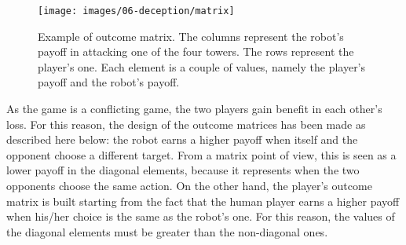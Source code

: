\begin{figure}[h]
    \centering
    \texttt{[image: images/06-deception/matrix]}
    \caption{Example of outcome matrix. The columns represent the  robot's payoff in attacking one of the four towers. The rows represent the player's one. Each element is a couple of values, namely the player's payoff and the robot's payoff.}
    \label{fig::matrix}
\end{figure}

As the game is a conflicting game, the two players gain benefit in each other's loss. For this reason, the design of the outcome matrices has been made as described here below: the robot earns a higher payoff when itself and the opponent choose a different target. From a matrix point of view, this is seen as a lower payoff in the diagonal elements, because it represents when the two opponents choose the same action.
On the other hand, the player's outcome matrix is built starting from the fact that the human player earns a higher payoff when his/her choice is the same as the robot's one. For this reason, the values of the diagonal elements must be greater than the non-diagonal ones. 

